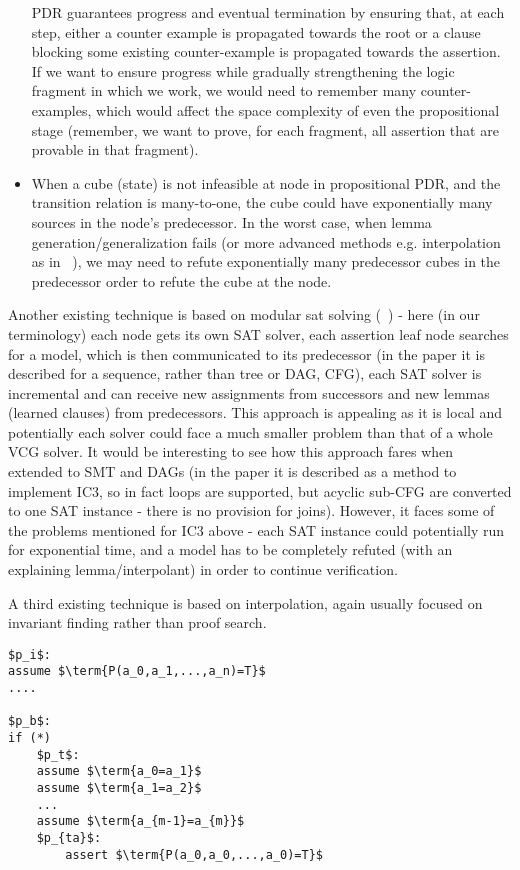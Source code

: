 \begin{itemize}
	PDR guarantees progress and eventual termination by ensuring that, at each step, either a counter example is propagated towards the root or a clause blocking some existing counter-example is propagated towards the assertion. If we want to ensure progress while gradually strengthening the logic fragment in which we work, we would need to remember many counter-examples, which would affect the space complexity of even the propositional stage (remember, we want to prove, for each fragment, all assertion that are provable in that fragment).
	\item When a cube (state) is not infeasible at node in propositional PDR, and the transition relation is many-to-one, the cube could have exponentially many sources in the node's predecessor. 
	In the worst case, when lemma generation/generalization fails (or more advanced methods e.g. interpolation as in ~\cite{VizelGurfinkel2014}), we may need to refute exponentially many predecessor cubes in the predecessor order to refute the cube at the node. 
\end{itemize}

Another existing technique is based on modular sat solving (~\cite{BaylessValBallHoosHu2013}) - here (in our terminology) each node gets its own SAT solver, each assertion leaf node searches for a model, which is then communicated to its predecessor (in the paper it is described for a sequence, rather than tree or DAG, CFG), each SAT solver is incremental and can receive new assignments from successors and new lemmas (learned clauses) from predecessors.
This approach is appealing as it is local and potentially each solver could face a much smaller problem than that of a whole VCG solver.
It would be interesting to see how this approach fares when extended to SMT and DAGs (in the paper it is described as a method to implement IC3, so in fact loops are supported, but acyclic sub-CFG are converted to one SAT instance - there is no provision for joins).
However, it faces some of the problems mentioned for IC3 above - each SAT instance could potentially run for exponential time, and a model has to be completely refuted (with an explaining lemma/interpolant) in order to continue verification.

A third existing technique is based on interpolation, again usually focused on invariant finding rather than proof search.

\begin{lstlisting}[caption=congruence closure propagation DSA,label=snippet3.6.1]
$p_i$:
assume $\term{P(a_0,a_1,...,a_n)=T}$
....

$p_b$:
if (*)
	$p_t$:
	assume $\term{a_0=a_1}$
	assume $\term{a_1=a_2}$
	...
	assume $\term{a_{m-1}=a_{m}}$
	$p_{ta}$:
		assert $\term{P(a_0,a_0,...,a_0)=T}$
\end{lstlisting}
\noindent

